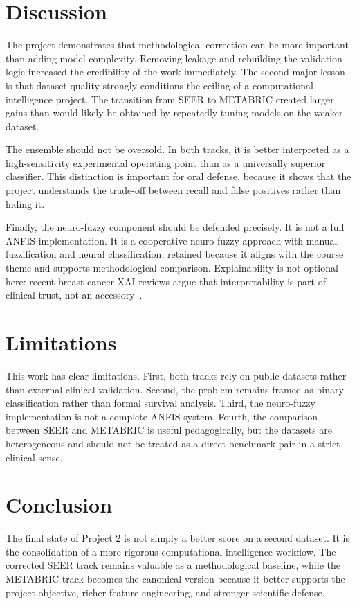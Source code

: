 \documentclass[conference]{IEEEtran}
\begin{document}
\section{Discussion}

The project demonstrates that methodological correction can be more important than adding model complexity. Removing leakage and rebuilding the validation logic increased the credibility of the work immediately. The second major lesson is that dataset quality strongly conditions the ceiling of a computational intelligence project. The transition from SEER to METABRIC created larger gains than would likely be obtained by repeatedly tuning models on the weaker dataset.

The ensemble should not be oversold. In both tracks, it is better interpreted as a high-sensitivity experimental operating point than as a universally superior classifier. This distinction is important for oral defense, because it shows that the project understands the trade-off between recall and false positives rather than hiding it.

Finally, the neuro-fuzzy component should be defended precisely. It is not a full ANFIS implementation. It is a cooperative neuro-fuzzy approach with manual fuzzification and neural classification, retained because it aligns with the course theme and supports methodological comparison. Explainability is not optional here: recent breast-cancer XAI reviews argue that interpretability is part of clinical trust, not an accessory~\cite{ghasemi2024}.

\section{Limitations}

This work has clear limitations. First, both tracks rely on public datasets rather than external clinical validation. Second, the problem remains framed as binary classification rather than formal survival analysis. Third, the neuro-fuzzy implementation is not a complete ANFIS system. Fourth, the comparison between SEER and METABRIC is useful pedagogically, but the datasets are heterogeneous and should not be treated as a direct benchmark pair in a strict clinical sense.

\section{Conclusion}

The final state of Project 2 is not simply a better score on a second dataset. It is the consolidation of a more rigorous computational intelligence workflow. The corrected SEER track remains valuable as a methodological baseline, while the METABRIC track becomes the canonical version because it better supports the project objective, richer feature engineering, and stronger scientific defense.
\end{document}
